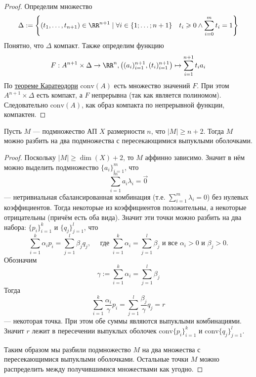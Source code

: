 \documentclass[12pt,a4paper]{article}
\newcommand{\conv}{\ensuremath{\mathrm{conv}}\xspace}
\begin{document}
    \begin{proof}
        Определим множество
        \[\Delta := \left\{(t_1, \dots, t_{n+1}) \in \RR^{n+1} \mid \forall i \in \{1; \dots; n+1\} \quad t_i \geqslant 0 \wedge \sum_{i=0}^m t_i = 1\right\}\]
        Понятно, что $\Delta$ компакт. Также определим функцию
        \[F: A^{n+1} \times \Delta \to \RR^n, \left((a_i)_{i=1}^{n+1}, (t_i)_{i=1}^{n+1}\right) \mapsto \sum_{i=1}^{n+1} t_i a_i\]
        По \hyperref[Caratheodory-theorem]{теореме Каратеодори} $\conv(A)$ есть множество значений $F$. При этом $A^{n+1} \times \Delta$ есть компакт, а $F$ непрерывна (так как является полиномом). Следовательно $\conv(A)$, как образ компакта по непрерывной функции, компактен.
    \end{proof}

    \begin{theorem}[Радон]
        Пусть $M$ --- подмножество АП $X$ размерности $n$, что $|M| \geqslant n+2$. Тогда $M$ можно разбить на два подмножества с пересекающимися выпуклыми оболочками.
    \end{theorem}

    \begin{proof}
        Поскольку $|M| \geqslant \dim(X) + 2$, то $M$ аффинно зависимо. Значит в нём можно выделить подмножество $\{a_i\}_{i=1}^m$, что
        \[\sum_{i=1}^m a_i \lambda_i = \vec{0}\]
        --- нетривиальная сбалансированная комбинация (т.е. $\sum_{i=1}^m \lambda_i = 0$) без нулевых коэффициентов. Тогда некоторые из коэффициентов положительны, а некоторые отрицательны (причём есть оба вида). Значит эти точки можно разбить на два набора: $\{p_i\}_{i=1}^k$ и $\{q_j\}_{j=1}^l$, что
        \[
            \sum_{i=1}^k \alpha_i p_i = \sum_{j=1}^l \beta_j q_j,
            \quad \text{ где } \sum_{i=1}^k \alpha_i = \sum_{j=1}^l \beta_j \text{ и все } \alpha_i > 0 \text{ и } \beta_j > 0.
        \]
        Обозначим
        \[\gamma := \sum_{i=1}^k \alpha_i = \sum_{j=1}^l \beta_j\]
        Тогда
        \[\sum_{i=1}^k \frac{\alpha_i}{\gamma} p_i = \sum_{j=1}^l \frac{\beta_j}{\gamma} q_j = r\]
        --- некоторая точка. При этом обе суммы являются выпуклыми комбинациями. Значит $r$ лежит в пересечении выпуклых оболочек $\conv\{p_i\}_{i=1}^k$ и $\conv\{q_j\}_{j=1}^l$.
        
        Таким образом мы разбили подмножество $M$ на два множества с пересекающимися выпуклыми оболочками. Остальные точки $M$ можно распределить между получившимися множествами как угодно.
    \end{proof}
\end{document}
